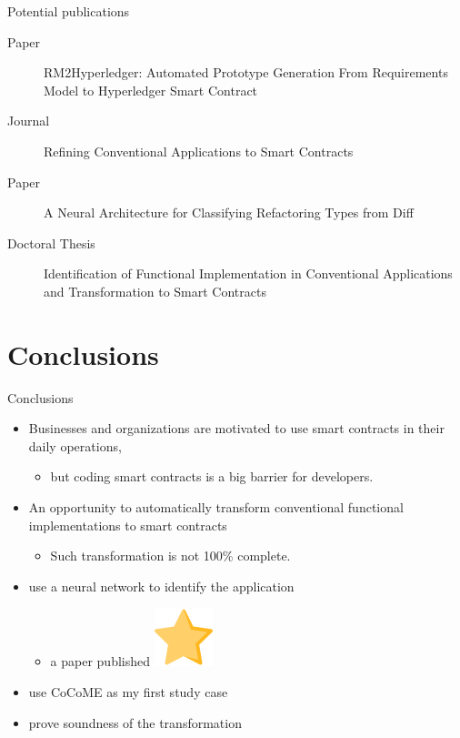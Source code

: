 \documentclass[xcolor=svgnames]{beamer}
\begin{document}
\begin{frame}{Potential publications}
\begin{description}
\item[Paper] RM2Hyperledger: Automated Prototype Generation From Requirements Model to Hyperledger Smart Contract
\item[Journal] Refining Conventional Applications to Smart Contracts
\item[Paper] A Neural Architecture for Classifying Refactoring Types from Diff
\item[Doctoral Thesis] Identification of Functional Implementation in Conventional Applications and Transformation to Smart Contracts
\end{description}
\end{frame}

\section{Conclusions}
\begin{frame}{Conclusions}

\begin{itemize}
\item Businesses and organizations are motivated to use smart contracts in their daily operations,
\begin{itemize}
\item but coding smart contracts is a big barrier for developers.
\end{itemize}

\item An opportunity to automatically transform conventional functional implementations to smart contracts
\begin{itemize}
\item Such transformation is not 100\%  complete.
\end{itemize}

\item use a neural network to identify the application
\begin{itemize}
\item a paper published \includegraphics[height=2ex, angle=20,origin=c, ]{favourite.png}
\end{itemize}

\item use CoCoME as my first study case
\item prove soundness of the transformation
\end{itemize}


\end{frame}
\end{document}
